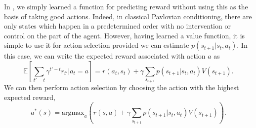 In , we simply learned a function for predicting reward without using this as the basis of taking good actions.
Indeed, in classical Pavlovian conditioning, there are only states which happen in a predetermined order with no intervention or control on the part of the agent.
However, having learned a value function, it is simple to use it for action selection provided we can estimate $p(s_{t+1} | s_t, a_t)$.
In this case, we can write the expected reward associated with action $a$ as
\begin{equation}
    \mathbb{E} \left [\sum_{t' = t} \gamma^{t'-t} r_{t'} | a_t = a \right ] = r(a_t, s_t) + \gamma \sum_{s_{t+1}} p(s_{t+1} | s_t, a_t) V(s_{t+1}).
\end{equation}
We can then perform action selection by choosing the action with the highest expected reward,
\begin{equation}
    \label{eq:value_action_selection}
    a^*(s) = \text{argmax}_{a} \left ( r(s, a) + \gamma \sum_{s_{t+1}} p(s_{t+1} | s_t, a_t) V(s_{t+1}) \right ).
\end{equation}

